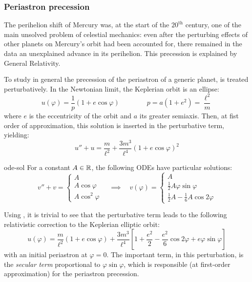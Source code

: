 
\subsubsection{Periastron precession}

The perihelion shift of Mercury was, at the start of the $ 20^\text{th} $ century, one of the main unsolved problem of celestial mechanics: even after the perturbing effects of other planets on Mercury's orbit had been accounted for, there remained in the data an unexplained advance in its perihelion. This precession is explained by General Relativity.

To study in general the precession of the periastron of a generic planet,  is treated perturbatively. In the Newtonian limit, the Keplerian orbit is an ellipse:
\begin{equation}
  u(\varphi) = \frac{1}{p} \left( 1 + e \cos \varphi \right)
  \qquad \qquad
  p = a \left( 1 + e^2 \right) = \frac{\ell^2}{m}
  \label{eq:keplerian-orbit}
\end{equation}
where $ e $ is the eccentricity of the orbit and $ a $ its greater semiaxis. Then, at fist order of approximation, this solution is inserted in the perturbative term, yielding:
\begin{equation*}
  u'' + u = \frac{m}{\ell^2} + \frac{3m^3}{\ell^4} \left( 1 + e \cos \varphi \right)^2
\end{equation*}

\begin{lemma}{}{ode-sol}
  For a constant $ A \in \mathbb{R} $, the following ODEs have particular solutions:
  \begin{equation}
    v'' + v =
    \begin{cases}
      A \\
      A \cos \varphi \\
      A \cos^2 \varphi
    \end{cases}
    \quad \implies \quad
    v(\varphi) =
    \begin{cases}
      A \\
      \tfrac{1}{2} A \varphi \sin \varphi \\
      \tfrac{1}{2} A - \tfrac{1}{6} A \cos 2 \varphi
    \end{cases}
  \end{equation}
\end{lemma}

Using , it is trivial to see that the perturbative term leads to the following relativistic correction to the Keplerian elliptic orbit:
\begin{equation}
  u(\varphi) = \frac{m}{\ell^2} \left( 1 + e \cos \varphi \right) + \frac{3m^3}{\ell^4} \left[ 1 + \frac{e^2}{2} - \frac{e^2}{6} \cos 2 \varphi + e \varphi \sin \varphi \right]
\end{equation}
with an initial periastron at $ \varphi = 0 $. The important term, in this perturbation, is the \emph{secular term} proportional to $ \varphi \sin \varphi $, which is responsible (at first-order approximation) for the periastron precession.

